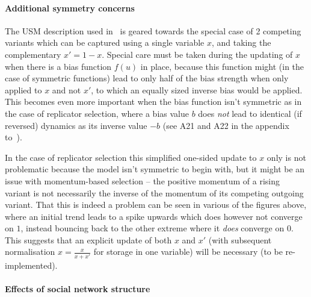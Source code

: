 \paragraph{Additional symmetry concerns}

The USM description used in~\citet{Blythe2012} is geared towards the special case of 2 competing variants which can be captured using a single variable $x$, and taking the complementary $x'=1-x$. Special care must be taken during the updating of $x$ when there is a bias function $f(u)$ in place, because this function might (in the case of symmetric functions) lead to only half of the bias strength when only applied to $x$ and not $x'$, to which an equally sized inverse bias would be applied. This becomes even more important when the bias function isn't symmetric as in the case of replicator selection, where a bias value $b$ does \emph{not} lead to identical (if reversed) dynamics as its inverse value $-b$ (see A21 and A22 in the appendix to~\citet{Blythe2012}).

In the case of replicator selection this simplified one-sided update to $x$ only is not problematic because the model isn't symmetric to begin with, but it might be an issue with momentum-based selection -- the positive momentum of a rising variant is not necessarily the inverse of the momentum of its competing outgoing variant. That this is indeed a problem can be seen in various of the figures above, where an initial trend leads to a spike upwards which does however not converge on $1$, instead bouncing back to the other extreme where it \emph{does} converge on 0. This suggests that an explicit update of both $x$ and $x'$ (with subsequent normalisation $x=\frac{x}{x+x'}$ for storage in one variable) will be necessary (to be re-implemented).

%
%
%

\paragraph{Effects of social network structure}

